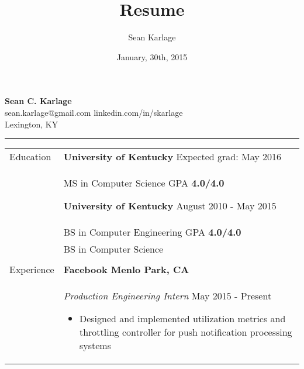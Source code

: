 \documentclass[11pt]{article}
\begin{document}
\title{Resume}            %
\author{Sean Karlage}    %
\date{January, 30th, 2015}    %
\thispagestyle{empty}
\pagestyle{empty}

\begin{center}
    {\LARGE\textbf{Sean C. Karlage}} \\
    sean.karlage@gmail.com \hspace{0.75cm} linkedin.com/in/skarlage \\
    Lexington, KY \vspace{1.0mm}\hrule
\end{center}

\vspace{0.05in}\noindent
\begin{tabular}{p{0.75in} p{5.45in}}

    {Education} &

        \textbf{University of Kentucky} \hfill Expected grad: May 2016 \vspace{0.015in} \\ &
        MS in Computer Science \hfill GPA \textbf{4.0/4.0} \vspace{0.09in}

        \textbf{University of Kentucky} \hfill August 2010 - May 2015 \vspace{0.015in} \\ &
        BS in Computer Engineering \hfill GPA \textbf{4.0/4.0} \vspace{0.015in} \\ &
        BS in Computer Science \\ \\[0.015in]

    {Experience} &
        \textbf{Facebook \hfill Menlo Park, CA} \vspace{0.015in} \\ &
        {\textit{Production Engineering Intern} \hfill May 2015 - Present} \vspace{0.02in}
        \begin{itemize}
            \renewcommand{\labelitemi}{$\diamond$}
            \item Designed and implemented utilization metrics and throttling controller for push notification processing systems
        \end{itemize} \vspace{0.09in}


\end{tabular}
\end{document}
